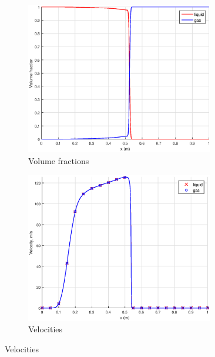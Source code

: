 \begin{figure}[H]
        \centering
        \begin{subfigure}[b]{0.495\textwidth}
                \centering
                \includegraphics[width=0.9\textwidth]{figures/Nearly_pure_alpha_1000cells.eps}
                \caption{Volume fractions\\ \phantom{A}}
                \label{fig:nearly_pure_alpha}
        \end{subfigure}%
        \begin{subfigure}[b]{0.495\textwidth}
                \centering
                \includegraphics[width=0.9\textwidth]{figures/Nearly_pure_velocity_1000cells.eps}
                \caption{Velocities\\  \phantom{A}}

\end{subfigure}
\end{figure}
